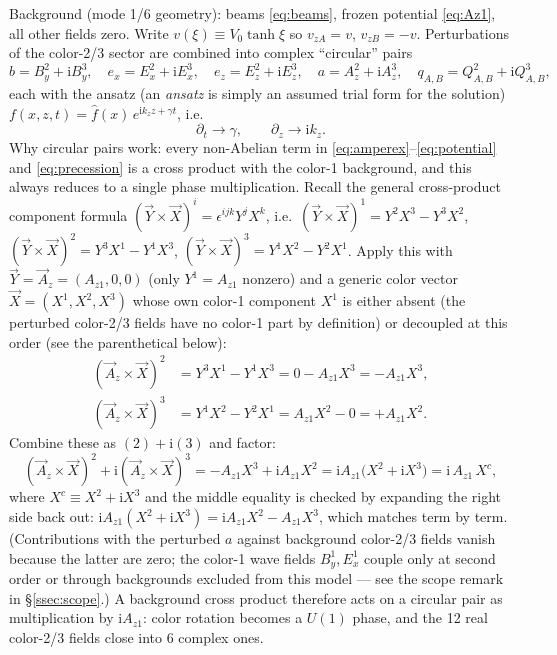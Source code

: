\documentclass[11pt,a4paper]{article}
\numberwithin{equation}{section}
\theoremstyle{remark}
\newcommand{\Vo}{V_0}
\newcommand{\kz}{k_z}
\newcommand{\Az}{A_{z1}}
\newcommand{\ii}{\mathrm{i}}
\begin{document}
Background (mode 1/6 geometry): beams \eqref{eq:beams}, frozen potential
\eqref{eq:Az1}, all other fields zero. Write $v(\xi)\equiv\Vo\tanh\xi$ so
$v_{zA}=v$, $v_{zB}=-v$. Perturbations of the color-2/3 sector are combined
into complex ``circular'' pairs
\begin{equation}
b=B_y^2+\ii B_y^3,\quad
e_x=E_x^2+\ii E_x^3,\quad
e_z=E_z^2+\ii E_z^3,\quad
a=A_z^2+\ii A_z^3,\quad
q_{A,B}=Q^2_{A,B}+\ii Q^3_{A,B},
\label{eq:circpairs}
\end{equation}
each with the ansatz (an \emph{ansatz} is simply an assumed trial form
for the solution) $f(x,z,t)=\hat f(x)\,e^{\ii\kz z+\gamma t}$, i.e.
\begin{equation}
\partial_t\to\gamma,\qquad \partial_z\to\ii\kz .
\end{equation}
Why circular pairs work: every non-Abelian term in
\eqref{eq:amperex}--\eqref{eq:potential} and \eqref{eq:precession} is a
cross product with the color-1 background, and this always reduces to a
single phase multiplication. Recall the general cross-product component
formula $(\vec Y\times\vec X)^i=\epsilon^{ijk}Y^jX^k$, i.e.\
$(\vec Y\times\vec X)^1=Y^2X^3-Y^3X^2$,
$(\vec Y\times\vec X)^2=Y^3X^1-Y^1X^3$,
$(\vec Y\times\vec X)^3=Y^1X^2-Y^2X^1$. Apply this with $\vec Y=\vec A_z
=(\Az,0,0)$ (only $Y^1=\Az$ nonzero) and a generic color vector
$\vec X=(X^1,X^2,X^3)$ whose own color-1 component $X^1$ is either absent
(the perturbed color-2/3 fields have no color-1 part by definition) or
decoupled at this order (see the parenthetical below):
\begin{align}
(\vec A_z\times\vec X)^2&=Y^3X^1-Y^1X^3=0-\Az X^3=-\Az X^3,\\
(\vec A_z\times\vec X)^3&=Y^1X^2-Y^2X^1=\Az X^2-0=+\Az X^2 .
\label{eq:crosscomponents}
\end{align}
Combine these as $(2)+\ii(3)$ and factor:
\begin{equation}
(\vec A_z\times\vec X)^2+\ii(\vec A_z\times\vec X)^3
=-\Az X^3+\ii\Az X^2
=\ii\Az\bigl(X^2+\ii X^3\bigr)
=\ii\,\Az\,X^c ,
\label{eq:crosscomplex}
\end{equation}
where $X^c\equiv X^2+\ii X^3$ and the middle equality is checked by
expanding the right side back out: $\ii\Az(X^2+\ii X^3)=\ii\Az X^2-\Az X^3$,
which matches term by term. (Contributions with the perturbed $a$ against
background color-2/3 fields vanish because the latter are zero; the
color-1 wave fields $B_y^1,E_x^1$ couple only at second order or through
backgrounds excluded from this model --- see the scope remark in
\S\ref{ssec:scope}.) A background cross product therefore acts on a
circular pair as multiplication by $\ii\Az$: color rotation becomes a
$U(1)$ phase, and the 12 real color-2/3 fields close into 6 complex ones.
\end{document}
